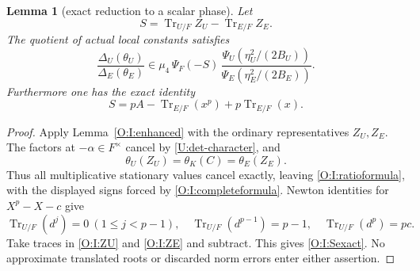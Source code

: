 \documentclass[11pt]{amsart}
\newtheorem{lemma}[theorem]{Lemma}
\theoremstyle{definition}
\theoremstyle{remark}
\newcommand{\Tr}{\operatorname{Tr}}
\begin{document}
\begin{lemma}[exact reduction to a scalar phase]\label{O:I:scalarphase}
Let
\begin{equation}\label{O:I:Sdef}
 S=\Tr_{U/F}Z_U-\Tr_{E/F}Z_E.
\end{equation}
The quotient of actual local constants satisfies
\begin{equation}\label{O:I:ratioformula}
 \frac{\Delta_U(\theta_U)}{\Delta_E(\theta_E)}
 \in\mu_4\,\Psi_F(-S)\,
 \frac{\Psi_U(\eta_U^2/(2B_U))}
      {\Psi_E(\eta_E^2/(2B_E))}.
\end{equation}
Furthermore one has the exact identity
\begin{equation}\label{O:I:Sexact}
 S=p A-\Tr_{E/F}(x^p)+p\Tr_{E/F}(x).
\end{equation}
\end{lemma}
\begin{proof}
Apply Lemma~\ref{O:I:enhanced} with the ordinary representatives $Z_U,Z_E$.
The factors at $-\alpha\in F^\times$ cancel by \eqref{U:det-character}, and
\[
 \theta_U(Z_U)=\theta_K(C)=\theta_E(Z_E).
\]
Thus all multiplicative stationary values cancel exactly, leaving
\eqref{O:I:ratioformula}, with the displayed signs forced by
\eqref{O:I:completeformula}.
Newton identities for $X^p-X-c$ give
\[
 \Tr_{U/F}(d^j)=0\ (1\le j<p-1),\quad
 \Tr_{U/F}(d^{p-1})=p-1,\quad
 \Tr_{U/F}(d^p)=pc.
\]
Take traces in \eqref{O:I:ZU} and \eqref{O:I:ZE} and subtract. This gives
\eqref{O:I:Sexact}. No approximate translated roots or discarded norm errors
enter either assertion.
\end{proof}
\end{document}

